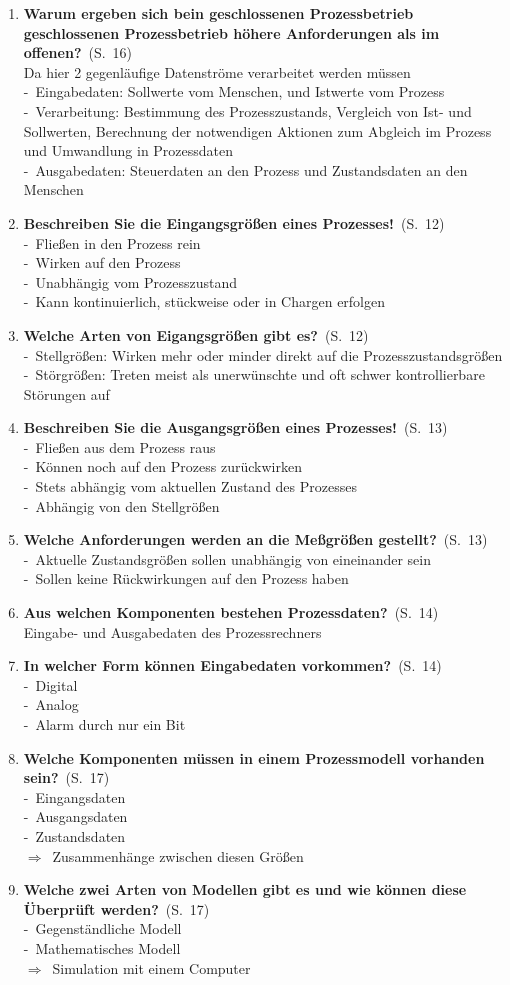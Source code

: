 \documentclass[a4paper,12pt]{article}
\newcommand{\question}[3]{\pagebreak[3]\item {\textbf{#1?}}\ (S.\ #2)#3}
\newcommand{\statement}[3]{\pagebreak[3]\item {\textbf{#1!}}\ (S.\ #2)#3}
\newcommand{\catchword}[1]{\\-\ #1}
\newcommand{\normaltext}[1]{\\#1}
\newcommand{\result}[1]{\\ $\Rightarrow$\ #1}
\newcommand{\page}[1]{#1}
\begin{document}
\begin{enumerate}
  \question{Warum ergeben sich bein geschlossenen Prozessbetrieb geschlossenen Prozessbetrieb
            höhere Anforderungen als im offenen}{\page{16}}
  {
    \normaltext{Da hier 2 gegenläufige Datenströme verarbeitet werden müssen}
    \catchword{Eingabedaten: Sollwerte vom Menschen, und Istwerte vom Prozess}
    \catchword{Verarbeitung: Bestimmung des Prozesszustands, Vergleich von Ist- und Sollwerten,
               Berechnung der notwendigen Aktionen zum Abgleich im Prozess und Umwandlung in Prozessdaten}
    \catchword{Ausgabedaten: Steuerdaten an den Prozess und Zustandsdaten an den Menschen}
  }

  \statement{Beschreiben Sie die Eingangsgrößen eines Prozesses}{\page{12}}
  {
    \catchword{Fließen in den Prozess rein}
    \catchword{Wirken auf den Prozess}
    \catchword{Unabhängig vom Prozesszustand}
    \catchword{Kann kontinuierlich, stückweise oder in Chargen erfolgen}
  }

  \question{Welche Arten von Eigangsgrößen gibt es}{\page{12}}
  {
    \catchword{Stellgrößen: Wirken mehr oder minder direkt auf die Prozesszustandsgrößen}
    \catchword{Störgrößen: Treten meist als unerwünschte und oft schwer kontrollierbare Störungen auf}
  }

  \statement{Beschreiben Sie die Ausgangsgrößen eines Prozesses}{\page{13}}
  {
    \catchword{Fließen aus dem Prozess raus}
    \catchword{Können noch auf den Prozess zurückwirken}
    \catchword{Stets abhängig vom aktuellen Zustand des Prozesses}
    \catchword{Abhängig von den Stellgrößen}
  }

  \question{Welche Anforderungen werden an die Meßgrößen gestellt}{\page{13}}
  {
    \catchword{Aktuelle Zustandsgrößen sollen unabhängig von eineinander sein}
    \catchword{Sollen keine Rückwirkungen auf den Prozess haben}
  }

  \question{Aus welchen Komponenten bestehen Prozessdaten}{\page{14}}
  {
    \normaltext{Eingabe- und Ausgabedaten des Prozessrechners}
  }

  \question{In welcher Form können Eingabedaten vorkommen}{\page{14}}
  {
    \catchword{Digital}
    \catchword{Analog}
    \catchword{Alarm durch nur ein Bit}
  }

  \question{Welche Komponenten müssen in einem Prozessmodell vorhanden sein}{\page{17}}
  {
    \catchword{Eingangsdaten}
    \catchword{Ausgangsdaten}
    \catchword{Zustandsdaten}
    \result{Zusammenhänge zwischen diesen Größen}
  }

  \question{Welche zwei Arten von Modellen gibt es und wie können diese Überprüft werden}{\page{17}}
  {
    \catchword{Gegenständliche Modell}
    \catchword{Mathematisches Modell}
    \result{Simulation mit einem Computer}
  }


\end{enumerate}
\end{document}
